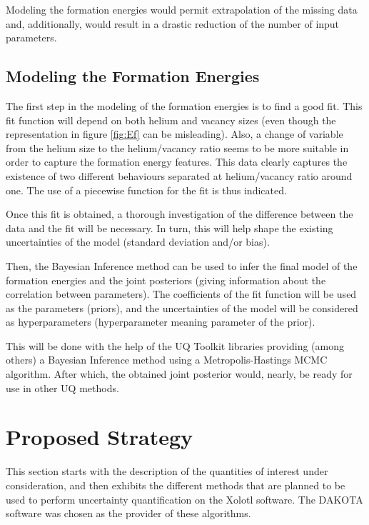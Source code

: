 \documentclass{article}
\begin{document}
Modeling the formation energies would permit extrapolation of the missing data
and, additionally, would result in a drastic reduction of the number of input
parameters.

\subsection{Modeling the Formation Energies}

The first step in the modeling of the formation energies is to find a good fit.
This fit function will depend on both helium and vacancy sizes (even
though the representation in figure \ref{fig:Ef} can be misleading). Also, a
change of variable from the helium size to the helium/vacancy ratio seems
to be more suitable in order to capture the formation energy features.  This
data clearly captures the existence of two different behaviours separated at
helium/vacancy ratio around one. The use of a piecewise function for the fit is
thus indicated. \newline

Once this fit is obtained, a thorough investigation of the difference between
the data and the fit will be necessary. In turn, this will help shape the
existing uncertainties of the model (standard deviation and/or bias). \newline

Then, the Bayesian Inference method can be used to infer the final model of the
formation energies and the joint posteriors (giving information about the
correlation between parameters). The coefficients of the fit function will be
used as the parameters (priors), and the uncertainties of the model will be
considered as hyperparameters (hyperparameter meaning parameter of the prior). 

This will be done with the help of the UQ Toolkit \cite{uqtk} libraries
providing (among others) a Bayesian Inference method using a Metropolis-Hastings
MCMC algorithm. After which, the obtained joint posterior would, nearly, be
ready for use in other UQ methods.

\section{Proposed Strategy}

This section starts with the description of the quantities of interest under
consideration, and then exhibits the different methods that are planned to be
used to perform uncertainty quantification on the Xolotl software. The
DAKOTA \cite{dakota} software was chosen as the provider of these algorithms.
\end{document}
